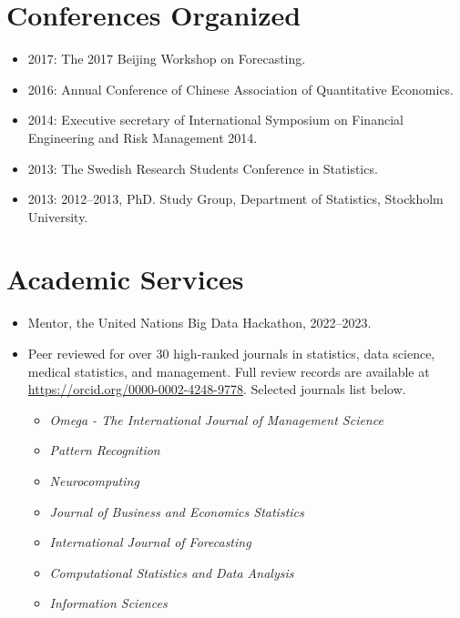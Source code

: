 \documentclass[twoside,a4paper]{article}
\begin{document}
\section*{Conferences Organized}

\begin{itemize}
\item 2017: The 2017 Beijing Workshop on Forecasting.
\item 2016: Annual Conference of Chinese Association of Quantitative Economics.
\item 2014: Executive secretary of International Symposium on Financial Engineering and Risk Management 2014.

\item 2013: The Swedish Research Students Conference in Statistics.
\item 2013: 2012–2013, PhD. Study Group, Department of Statistics, Stockholm University.
\end{itemize}

\section*{Academic Services}

\begin{itemize}
\item Mentor, the United Nations Big Data Hackathon, 2022--2023.

\item Peer reviewed for over 30 high-ranked journals in statistics, data science, medical statistics, and management. Full review records are available at \url{https://orcid.org/0000-0002-4248-9778}. Selected journals list below.

\begin{itemize}
\item \emph{Omega - The International Journal of Management Science}
\item \emph{Pattern Recognition}
\item \emph{Neurocomputing}
\item  \emph{Journal of Business and Economics Statistics}
\item  \emph{International Journal of Forecasting}
\item  \emph{Computational Statistics and Data Analysis}
\item  \emph{Information Sciences}
\end{itemize}
\end{itemize}
\end{document}
